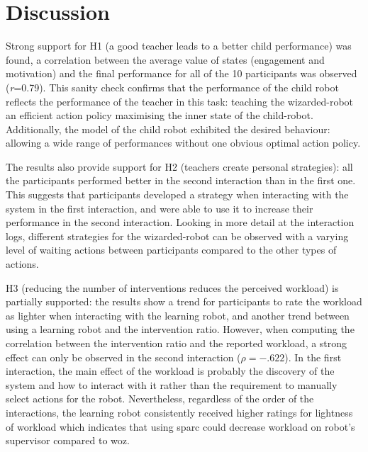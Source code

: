 
\section{Discussion}


Strong support for H1 (a good teacher leads to a better child performance) was found, a correlation between the average value of states (engagement and motivation) and the final performance for all of the 10 participants was observed (\textit{r}=0.79). This sanity check confirms that the performance of the child robot reflects the performance of the teacher in this task: teaching the wizarded-robot an efficient action policy maximising the inner state of the child-robot. Additionally, the model of the child robot exhibited the desired behaviour: allowing a wide range of performances without one obvious optimal action policy.

The results also provide support for H2 (teachers create personal strategies): all the participants performed better in the second interaction than in the first one. This suggests that participants developed a strategy when interacting with the system in the first interaction, and were able to use it to increase their performance in the second interaction. Looking in more detail at the interaction logs, different strategies for the wizarded-robot can be observed with a varying level of waiting actions between participants compared to the other types of actions.

H3 (reducing the number of interventions reduces the perceived workload) is partially supported: the results show a trend for participants to rate the workload as lighter when interacting with the learning robot, and another trend between using a learning robot and the intervention ratio. However, when computing the correlation between the intervention ratio and the reported workload, a strong effect can only be observed in the second interaction ($\rho = -.622$). In the first interaction, the main effect of the workload is probably the discovery of the system and how to interact with it rather than the requirement to manually select actions for the robot. Nevertheless, regardless of the order of the interactions, the learning robot consistently received higher ratings for lightness of workload which indicates that using \gls{sparc} could decrease workload on robot's supervisor compared to \gls{woz}.

